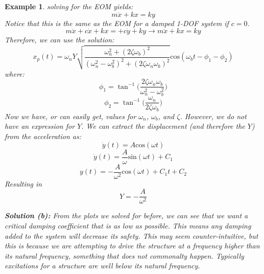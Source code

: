 \documentclass[12pt,letter]{article}
\newtheorem{ex}{Example}
\numberwithin{ex}{section} %
\newenvironment{example}{\begin{mdframed}[middlelinewidth=0.5mm]\begin{ex}\normalfont}{\end{ex}\end{mdframed}}
\numberwithin{re}{section} %
\numberwithin{pr}{section} %
\begin{document}
\begin{example}
					solving for the EOM yields:
					\begin{equation}
						m\ddot{x} + kx = ky
					\end{equation} 				
					Notice that this is the same as the EOM for a damped 1-DOF system if $c=0$.	
					\begin{equation}
					m\ddot{x} + c\dot{x} + kx = + c\dot{y} + ky \rightarrow m\ddot{x} + kx = ky
					\end{equation}
					Therefore, we can use the solution:
					\begin{equation}
						x_p(t) = 	\omega_n Y   \sqrt{\frac{\omega_n^2 + (2 \zeta \omega_b)^2 }{(\omega_n^2 - \omega_b^2)^2 +  (2\zeta \omega_n \omega_b)^2} }  \text{cos}(\omega_bt - \phi_1 - \phi_2)
					\end{equation}
					where:
					\begin{equation}
						\phi_1 = \tan^{-1} \bigg(\frac{2\zeta \omega_n \omega_b}{\omega_n^2 - \omega_b^2}\bigg)
					\end{equation}	
					\begin{equation}
						\phi_2 = \tan^{-1} \bigg(\frac{\omega_n}{2\zeta \omega_b}\bigg)
					\end{equation}
					Now we have, or can easily get, values for $\omega_n$, $\omega_b$, and $\zeta$. However, we do not have an expression for $Y$. We can extract the displacement (and therefore the $Y$) from the acceleration as:
					\begin{equation}
						\ddot{y}(t) = A \text{cos}(\omega t)
					\end{equation} 				
					\begin{equation}
						\dot{y}(t) = \frac{A}{\omega} \text{sin}(\omega t) + C_1
					\end{equation} 					
					\begin{equation}
						y(t) = - \frac{A}{\omega^2} \text{cos}(\omega t) + C_1t + C_2
					\end{equation} 					
					Resulting in 
					\begin{equation}
						Y = -\frac{A}{\omega^2}
					\end{equation} 			
					
					\noindent\textbf{Solution (b):} From the plots we solved for before, we can see that we want a critical damping coefficient that is as low as possible. This means any damping added to the system will decrease its safety. This may seem counter-intuitive, but this is because we are attempting to drive the structure at a frequency higher than its natural frequency, something that does not commonalty happen. Typically excitations for a structure are well below its natural frequency.  			
				
				\end{example}			
\end{document}

